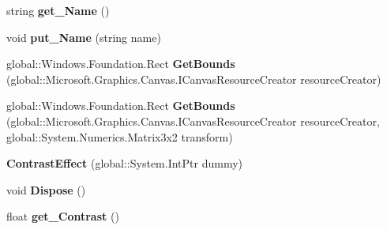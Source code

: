 \begin{DoxyCompactItemize}
\item 
\mbox{\label{class_microsoft_1_1_graphics_1_1_canvas_1_1_effects_1_1_contrast_effect_aaecf19cce74e2ea970a1c0c6f2adf75c}} 
string {\bfseries get\+\_\+\+Name} ()
\item 
\mbox{\label{class_microsoft_1_1_graphics_1_1_canvas_1_1_effects_1_1_contrast_effect_abc318b4aa26dee2333a52d0e70b53a88}} 
void {\bfseries put\+\_\+\+Name} (string name)
\item 
\mbox{\label{class_microsoft_1_1_graphics_1_1_canvas_1_1_effects_1_1_contrast_effect_a8d8d0baa90784d8ceef5e69730b00aa4}} 
global\+::\+Windows.\+Foundation.\+Rect {\bfseries Get\+Bounds} (global\+::\+Microsoft.\+Graphics.\+Canvas.\+I\+Canvas\+Resource\+Creator resource\+Creator)
\item 
\mbox{\label{class_microsoft_1_1_graphics_1_1_canvas_1_1_effects_1_1_contrast_effect_a7d7ad97626f28fed20870cf46f5910da}} 
global\+::\+Windows.\+Foundation.\+Rect {\bfseries Get\+Bounds} (global\+::\+Microsoft.\+Graphics.\+Canvas.\+I\+Canvas\+Resource\+Creator resource\+Creator, global\+::\+System.\+Numerics.\+Matrix3x2 transform)
\item 
\mbox{\label{class_microsoft_1_1_graphics_1_1_canvas_1_1_effects_1_1_contrast_effect_a8088c0c5b388e6b2ce8eeb3b08c3c7b0}} 
{\bfseries Contrast\+Effect} (global\+::\+System.\+Int\+Ptr dummy)
\item 
\mbox{\label{class_microsoft_1_1_graphics_1_1_canvas_1_1_effects_1_1_contrast_effect_a6f1bc711c2e2f43a2cdbf5f599a01945}} 
void {\bfseries Dispose} ()
\item 
\mbox{\label{class_microsoft_1_1_graphics_1_1_canvas_1_1_effects_1_1_contrast_effect_a140d08b77f0edc43a81972e67cc7bc4b}} 
float {\bfseries get\+\_\+\+Contrast} ()

\end{DoxyCompactItemize}
